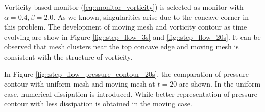 \documentclass[mathpazo]{aamm}
\begin{document}
      Vorticity-based monitor (\ref{eq::monitor_vorticity}) is
      selected as monitor with $\alpha = 0.4, \beta =
      2.0$. As we known, singularities arise due to the concave corner in this
      problem. The development of
      moving mesh and vorticity contour as time evolving are show in Figure
      \ref{fig::step_flow_3s} and \ref{fig::step_flow_20s}. %
      It can be observed that mesh clusters near the top concave edge
      and moving mesh is consistent with the structure of vorticity.

      In Figure \ref{fig::step_flow_pressure_contour_20s}, the
      comparation of pressure contour with uniform mesh and moving
      mesh at $t = 20$ are shown. In the uniform case, numerical
      dissipation is introduced. While better representation of
      pressure contour with less dissipation is obtained in the moving case.    
       



\end{document}
